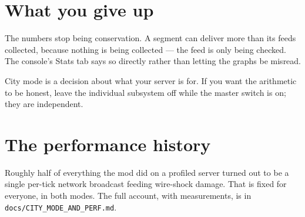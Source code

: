 \section{What you give up}

The numbers stop being conservation. A segment can deliver more than its feeds collected, because
nothing is being collected --- the feed is only being checked. The console's Stats tab says so
directly rather than letting the graphs be misread.

\begin{iewarning}
City mode is a decision about what your server is for. If you want the arithmetic to be honest,
leave the individual subsystem off while the master switch is on; they are independent.
\end{iewarning}

\section{The performance history}

Roughly half of everything the mod did on a profiled server turned out to be a single per-tick
network broadcast feeding wire-shock damage. That is fixed for everyone, in both modes. The full
account, with measurements, is in \texttt{docs/CITY\_MODE\_AND\_PERF.md}.
